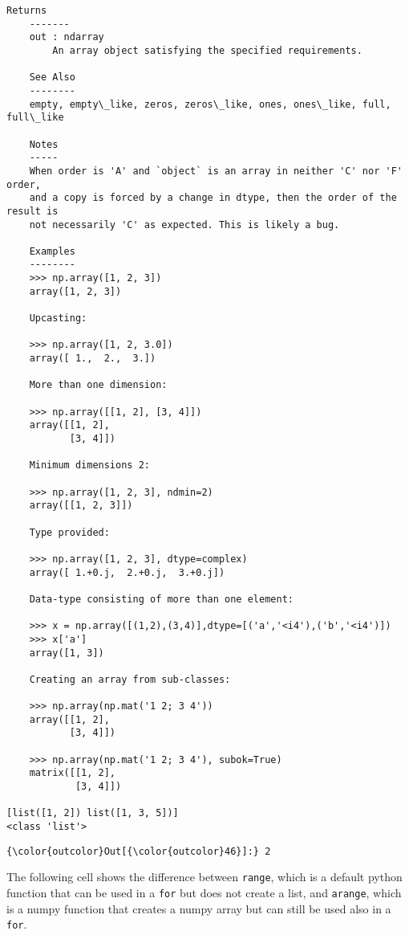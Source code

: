 \documentclass[11pt]{article}
\begin{document}
\begin{Verbatim}[commandchars=\\\{\}]
    Returns
    -------
    out : ndarray
        An array object satisfying the specified requirements.
    
    See Also
    --------
    empty, empty\_like, zeros, zeros\_like, ones, ones\_like, full, full\_like
    
    Notes
    -----
    When order is 'A' and `object` is an array in neither 'C' nor 'F' order,
    and a copy is forced by a change in dtype, then the order of the result is
    not necessarily 'C' as expected. This is likely a bug.
    
    Examples
    --------
    >>> np.array([1, 2, 3])
    array([1, 2, 3])
    
    Upcasting:
    
    >>> np.array([1, 2, 3.0])
    array([ 1.,  2.,  3.])
    
    More than one dimension:
    
    >>> np.array([[1, 2], [3, 4]])
    array([[1, 2],
           [3, 4]])
    
    Minimum dimensions 2:
    
    >>> np.array([1, 2, 3], ndmin=2)
    array([[1, 2, 3]])
    
    Type provided:
    
    >>> np.array([1, 2, 3], dtype=complex)
    array([ 1.+0.j,  2.+0.j,  3.+0.j])
    
    Data-type consisting of more than one element:
    
    >>> x = np.array([(1,2),(3,4)],dtype=[('a','<i4'),('b','<i4')])
    >>> x['a']
    array([1, 3])
    
    Creating an array from sub-classes:
    
    >>> np.array(np.mat('1 2; 3 4'))
    array([[1, 2],
           [3, 4]])
    
    >>> np.array(np.mat('1 2; 3 4'), subok=True)
    matrix([[1, 2],
            [3, 4]])

[list([1, 2]) list([1, 3, 5])]
<class 'list'>

    \end{Verbatim}

\begin{Verbatim}[commandchars=\\\{\}]
{\color{outcolor}Out[{\color{outcolor}46}]:} 2
\end{Verbatim}
            
    The following cell shows the difference between \texttt{range}, which is
a default python function that can be used in a \texttt{for} but does
not create a list, and \texttt{arange}, which is a numpy function that
creates a numpy array but can still be used also in a \texttt{for}.
\end{document}
